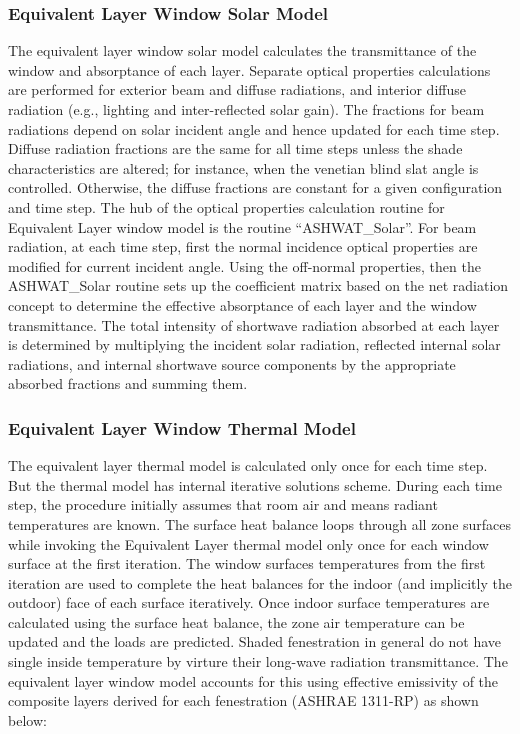 {\subsubsection{Equivalent Layer Window Solar Model}\label{equivalent-layer-window-solar-model}

The equivalent layer window solar model calculates the transmittance of the window and absorptance of each layer. Separate optical properties calculations are performed for exterior beam and diffuse radiations, and interior diffuse radiation (e.g., lighting and inter-reflected solar gain). The fractions for beam radiations depend on solar incident angle and hence updated for each time step. Diffuse radiation fractions are the same for all time steps unless the shade characteristics are altered; for instance, when the venetian blind slat angle is controlled. Otherwise, the diffuse fractions are constant for a given configuration and time step. The hub of the optical properties calculation routine for Equivalent Layer window model is the routine ``ASHWAT\_Solar''. For beam radiation, at each time step, first the normal incidence optical properties are modified for current incident angle. Using the off-normal properties, then the ASHWAT\_Solar routine sets up the coefficient matrix based on the net radiation concept to determine the effective absorptance of each layer and the window transmittance. The total intensity of shortwave radiation absorbed at each layer is determined by multiplying the incident solar radiation, reflected internal solar radiations, and internal shortwave source components by the appropriate absorbed fractions and summing them.

\subsubsection{Equivalent Layer Window Thermal Model}\label{equivalent-layer-window-thermal-model}

The equivalent layer thermal model is calculated only once for each time step. But the thermal model has internal iterative solutions scheme. During each time step, the procedure initially assumes that room air and means radiant temperatures are known. The surface heat balance loops through all zone surfaces while invoking the Equivalent Layer thermal model only once for each window surface at the first iteration. The window surfaces temperatures from the first iteration are used to complete the heat balances for the indoor (and implicitly the outdoor) face of each surface iteratively. Once indoor surface temperatures are calculated using the surface heat balance, the zone air temperature can be updated and the loads are predicted. Shaded fenestration in general do not have single inside temperature by virture their long-wave radiation transmittance. The equivalent layer window model accounts for this using effective emissivity of the composite layers derived for each fenestration (ASHRAE 1311-RP) as shown below:

}
